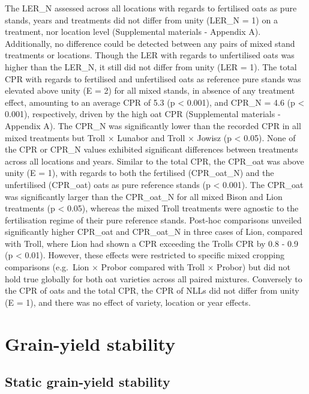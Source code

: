 \documentclass[
  british,
  a4paper,
  DIV=11,
  numbers=noendperiod]{scrreprt}
\begin{document}
The LER\_N assessed across all locations with regards to fertilised oats
as pure stands, years and treatments did not differ from unity (LER\_N =
1) on a treatment, nor location level (Supplemental materials - Appendix
A). Additionally, no difference could be detected between any pairs of
mixed stand treatments or locations. Though the LER with regards to
unfertilised oats was higher than the LER\_N, it still did not differ
from unity (LER = 1). The total CPR with regards to fertilised and
unfertilised oats as reference pure stands was elevated above unity (E =
2) for all mixed stands, in absence of any treatment effect, amounting
to an average CPR of 5.3 (p \textless{} 0.001), and CPR\_N = 4.6 (p
\textless{} 0.001), respectively, driven by the high oat CPR
(Supplemental materials - Appendix A). The CPR\_N was significantly
lower than the recorded CPR in all mixed treatments but Troll × Lunabor
and Troll × Jowisz (p \textless{} 0.05). None of the CPR or CPR\_N
values exhibited significant differences between treatments across all
locations and years. Similar to the total CPR, the CPR\_oat was above
unity (E = 1), with regards to both the fertilised (CPR\_oat\_N) and the
unfertilised (CPR\_oat) oats as pure reference stands (p \textless{}
0.001). The CPR\_oat was significantly larger than the CPR\_oat\_N for
all mixed Bison and Lion treatments (p \textless{} 0.05), whereas the
mixed Troll treatments were agnostic to the fertilisation regime of
their pure reference stands. Post-hoc comparisons unveiled significantly
higher CPR\_oat and CPR\_oat\_N in three cases of Lion, compared with
Troll, where Lion had shown a CPR exceeding the Trolls CPR by 0.8 - 0.9
(p \textless{} 0.01). However, these effects were restricted to specific
mixed cropping comparisons (e.g.~Lion × Probor compared with Troll ×
Probor) but did not hold true globally for both oat varieties across all
paired mixtures. Conversely to the CPR of oats and the total CPR, the
CPR of NLLs did not differ from unity (E = 1), and there was no effect
of variety, location or year effects.

\section{Grain-yield stability}\label{grain-yield-stability}

\subsection{Static grain-yield
stability}\label{static-grain-yield-stability-1}
\end{document}
